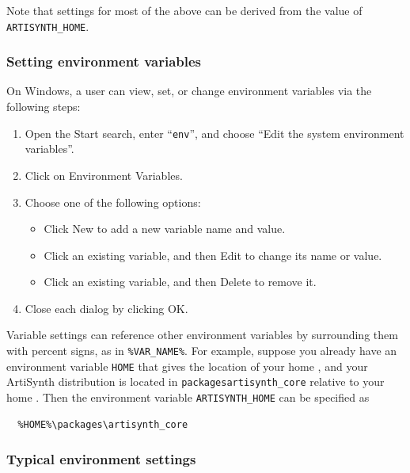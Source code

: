 
Note that settings for most of the above can be derived from the value
of {\tt ARTISYNTH\_HOME}.

\ifWindows
\subsubsection{Setting environment variables}
\label{settingWindowsVariables}

On Windows, a user can view, set, or change environment variables via
the following steps:

\begin{enumerate}

\item Open the {\sf Start} search, enter ``{\tt env}'', and choose
{\sf ``Edit the system environment variables''}.
\item Click on {\sf Environment Variables}.
\item Choose one of the following options:

\begin{itemize}
\item Click {\sf New} to add a new variable name and value.
\item Click an existing variable, and then {\sf Edit} to change its name or value.
\item Click an existing variable, and then {\sf Delete} to remove it.
\end{itemize}

\item Close each dialog by clicking {\sf OK}.

\end{enumerate}

Variable settings can reference other environment variables by
surrounding them with percent signs, as in {\tt \%VAR\_NAME\%}.  For
example, suppose you already have an environment variable {\tt HOME} that
gives the location of your home \directory{}, and your ArtiSynth
distribution is located in {\tt packages\SEP artisynth\_core} relative to your
home \directory{}. Then the environment variable {\tt ARTISYNTH\_HOME} can be
specified as

\begin{verbatim}
  %HOME%\packages\artisynth_core
\end{verbatim}

\subsubsection{Typical environment settings}
\label{TypicalEnvironment}

